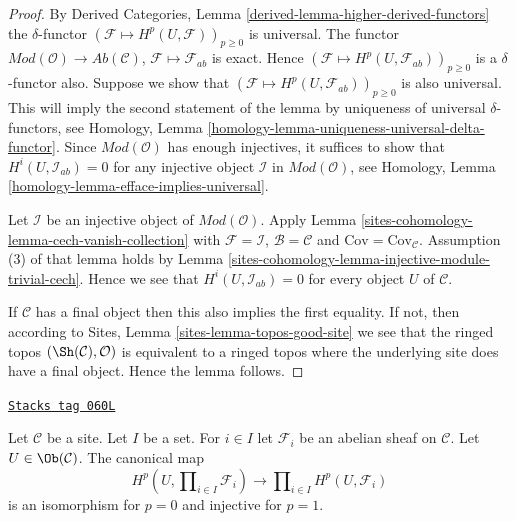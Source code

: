 \begin{proof}
By
Derived Categories, Lemma \ref{derived-lemma-higher-derived-functors}
the $\delta$-functor $(\mathcal{F} \mapsto H^p(U, \mathcal{F}))_{p \geq 0}$
is universal. The functor
$\textit{Mod}(\mathcal{O}) \to \textit{Ab}(\mathcal{C})$,
$\mathcal{F} \mapsto \mathcal{F}_{ab}$ is exact. Hence
$(\mathcal{F} \mapsto H^p(U, \mathcal{F}_{ab}))_{p \geq 0}$
is a $\delta$-functor also. Suppose we show that
$(\mathcal{F} \mapsto H^p(U, \mathcal{F}_{ab}))_{p \geq 0}$
is also universal. This will imply the second statement of the lemma
by uniqueness of universal $\delta$-functors, see
Homology, Lemma \ref{homology-lemma-uniqueness-universal-delta-functor}.
Since $\textit{Mod}(\mathcal{O})$ has enough injectives,
it suffices to show that $H^i(U, \mathcal{I}_{ab}) = 0$
for any injective object $\mathcal{I}$ in $\textit{Mod}(\mathcal{O})$, see
Homology, Lemma \ref{homology-lemma-efface-implies-universal}.

\medskip\noindent
Let $\mathcal{I}$ be an injective object of $\textit{Mod}(\mathcal{O})$.
Apply Lemma \ref{sites-cohomology-lemma-cech-vanish-collection}
with $\mathcal{F} = \mathcal{I}$, $\mathcal{B} = \mathcal{C}$
and $\text{Cov} = \text{Cov}_\mathcal{C}$.
Assumption (3) of that lemma holds by
Lemma \ref{sites-cohomology-lemma-injective-module-trivial-cech}.
Hence we see that $H^i(U, \mathcal{I}_{ab}) = 0$
for every object $U$ of $\mathcal{C}$.

\medskip\noindent
If $\mathcal{C}$ has a final
object then this also implies the first equality. If not, then
according to Sites, Lemma \ref{sites-lemma-topos-good-site} we see that
the ringed topos $(\Sh(\mathcal{C}), \mathcal{O})$ is equivalent to a
ringed topos where the underlying site does have a final object.
Hence the lemma follows.
\end{proof}

\begin{lemma}
\label{sites-cohomology-lemma-cohomology-products}
\href{https://stacks.math.columbia.edu/tag/060L}{\texttt{Stacks tag 060L}}

Let $\mathcal{C}$ be a site. Let $I$ be a set. For $i \in I$ let
$\mathcal{F}_i$ be an abelian sheaf on $\mathcal{C}$. Let
$U \in \Ob(\mathcal{C})$. The canonical map
$$
H^p(U, \prod\nolimits_{i \in I} \mathcal{F}_i)
\longrightarrow
\prod\nolimits_{i \in I} H^p(U, \mathcal{F}_i)
$$
is an isomorphism for $p = 0$ and injective for $p = 1$.
\end{lemma}

